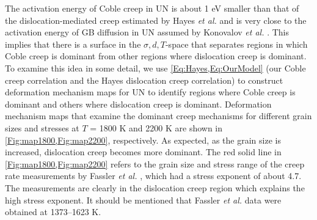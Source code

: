 \documentclass[preprint,12pt,sort&compress]{elsarticle}
\newcommand{\?}{\stackrel{?}{=}}
\begin{document}
The activation energy of Coble creep in UN is about 1 eV smaller than that of the dislocation-mediated creep estimated by Hayes \textit{et al.} \cite{Hayes1990II} and is very close to the activation energy of GB diffusion in UN assumed by Konovalov \textit{et al.} \cite{Konovalov2016}. This implies that there is a surface in the $\sigma, d, T$-space that separates regions in which Coble creep is dominant from other regions where dislocation creep is dominant. To examine this idea in some detail, we use \cref{Eq:Hayes,Eq:OurModel} (our Coble creep correlation and the Hayes dislocation creep correlation) to construct deformation mechanism maps for UN to identify regions where Coble creep is dominant and others where dislocation creep is dominant. Deformation mechanism maps that examine the dominant creep mechanisms for different grain sizes and stresses at $T$ = 1800 K and 2200 K are shown in \cref{Fig:map1800,Fig:map2200}, respectively. As expected, as the grain size is increased, dislocation creep becomes more dominant. The red solid line in \cref{Fig:map1800,Fig:map2200} refers to the grain size and stress range of the creep rate measurements by Fassler \textit{et al.} \cite{Fassler1965}, which had a stress exponent of about 4.7. The measurements are clearly in the dislocation creep region which explains the high stress exponent. It should be mentioned that Fassler \textit{et al.} data were obtained at 1373--1623 K.
\end{document}

